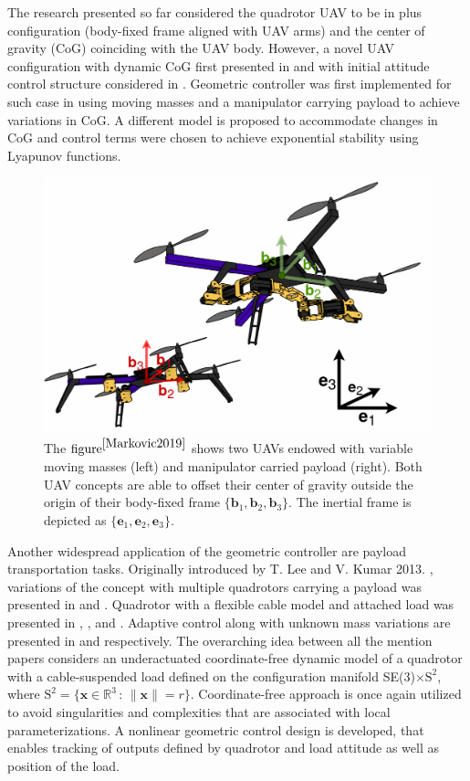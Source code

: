 The research presented so far considered the quadrotor UAV to be in plus configuration (body-fixed frame aligned with UAV arms) and the center of gravity (CoG) coinciding with the UAV body. However, a novel UAV configuration with dynamic CoG first presented in \cite{movingMass1} and \cite{movingMass2} with initial attitude control structure considered in \cite{movingMass3}. Geometric controller was first implemented for such case in \cite{Markovic2019} using moving masses and a manipulator carrying payload to achieve variations in CoG. A different model is proposed to accommodate changes in CoG and control terms were chosen to achieve exponential stability using Lyapunov functions.
\begin{figure}[H]
	\includegraphics[width=0.85\columnwidth]{figure/uav.png}	
	\centering
	\caption{The $\text{figure}^{\cite{Markovic2019}}$ shows two UAVs endowed with variable moving masses (left) and manipulator carried payload (right). Both UAV concepts are able to offset their center of gravity outside the origin of their body-fixed frame $\{\textbf{b}_1, \textbf{b}_2, \textbf{b}_3\}$. The inertial frame is depicted as $\{\textbf{e}_1, \textbf{e}_2, \textbf{e}_3\}$.  }
	\label{fig:uav_model}
\end{figure}

Another widespread application of the geometric controller are payload transportation tasks. Originally introduced by T. Lee and V. Kumar 2013. \cite{cable-load1}, variations of the concept with multiple quadrotors carrying a payload was presented in \cite{cable-load-multiple} and \cite{Lee2014GeometricCO}. Quadrotor with a flexible cable model and attached load was presented in \cite{tethered-quadrotor}, \cite{flexible-cable}, \cite{flexible-cable-dynamics} and \cite{stabilization-flexible-cable}. Adaptive control along with unknown mass variations are presented in  \cite{rigid-body-transport} and \cite{unknown-mass-transport} respectively.
The overarching idea between all the mention papers considers an underactuated coordinate-free dynamic model of a quadrotor with a cable-suspended load defined on the configuration manifold SE(3)$\times\text{S}^2$, where $\text{S}^2 = \{\textbf{x} \in \mathbb{R}^{3} \,:\, \lVert \textbf{x} \rVert = r \}$. Coordinate-free approach is once again utilized to avoid singularities and complexities that are associated with local parameterizations. A nonlinear geometric control design is developed, that enables tracking of outputs defined by quadrotor and load attitude as well as position of the load. 

